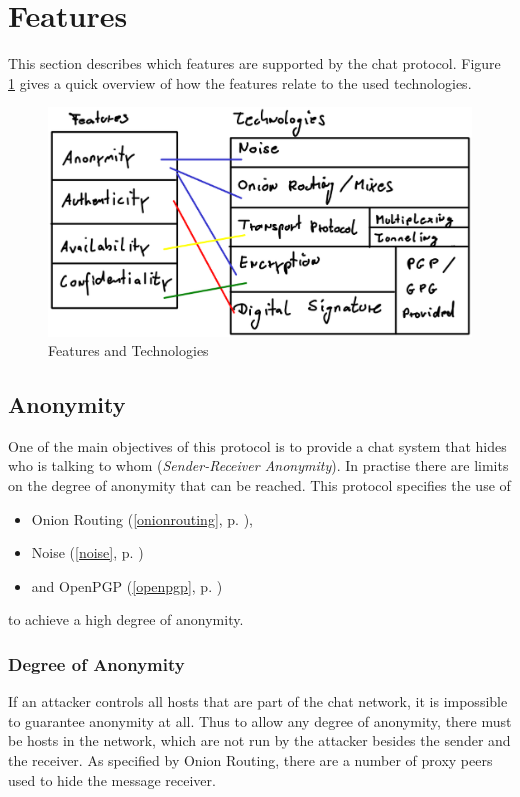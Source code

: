 \section{Features}
\label{protofeatures}
This section describes which features are supported by the chat protocol.
Figure \ref{features-technologies} gives a quick overview of how the
features relate to the used technologies.
\begin{figure}
    \centering
    \caption{Features and Technologies}
    \label{features-technologies}
    \includegraphics[scale=0.8]{features-technologies.eps}
\end{figure}
\subsection{Anonymity}
One of the main objectives of this protocol is to provide a chat system that
hides who is talking to whom (\textit{Sender-Receiver Anonymity}). 
In practise there are limits on the degree of anonymity that can be reached.
This protocol specifies the use of
\begin{itemize}
\item Onion Routing (\ref{onionrouting}, p. \pageref{onionrouting}),
\item Noise (\ref{noise}, p. \pageref{noise})
\item and OpenPGP (\ref{openpgp}, p. \pageref{openpgp})
\end{itemize}
to achieve a high degree of anonymity.
\subsubsection{Degree of Anonymity}
\label{degreeofanonymity}
If an attacker controls all hosts that are part of the chat network, 
it is impossible to guarantee anonymity at all.
Thus to allow any degree of anonymity, there must be hosts in the network,
which are not run by the attacker besides the sender and the receiver.
As specified by Onion Routing, there are a number of proxy peers used
to hide the message receiver.

